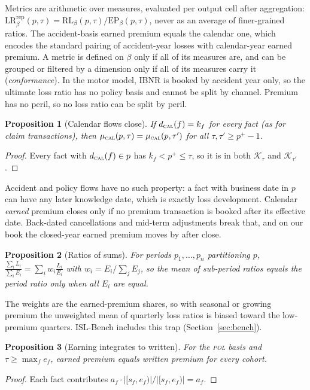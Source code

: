 \documentclass[11pt]{article}
\newtheorem{proposition}{Proposition}
\begin{document}
Metrics are arithmetic over measures, evaluated per output cell after aggregation:
$\mathrm{LR}^{\mathrm{rep}}_\beta(p,\tau) = \mathrm{RL}_\beta(p,\tau) / \mathrm{EP}_\beta(p,\tau)$, never as an
average of finer-grained ratios. The accident-basis earned premium equals the calendar one, which encodes the
standard pairing of accident-year losses with calendar-year earned premium. A metric is defined on $\beta$ only
if all of its measures are, and can be grouped or filtered by a dimension only if all of its measures carry it
(\emph{conformance}). In the motor model, IBNR is booked by accident year only, so the ultimate loss ratio has
no policy basis and cannot be split by channel. Premium has no peril, so no loss ratio can be split by peril.

\begin{proposition}[Calendar flows close]
If $d_{\textsc{cal}}(f) = k_f$ for every fact (as for claim transactions), then
$\mu_{\textsc{cal}}(p,\tau) = \mu_{\textsc{cal}}(p,\tau')$ for all $\tau, \tau' \ge p^+ - 1$.
\end{proposition}
\begin{proof}
Every fact with $d_{\textsc{cal}}(f) \in p$ has $k_f < p^+ \le \tau$, so it is in both $\mathcal{K}_\tau$ and
$\mathcal{K}_{\tau'}$.
\end{proof}
Accident and policy flows have no such property: a fact with business date in $p$ can have any later knowledge
date, which is exactly loss development. Calendar \emph{earned} premium closes only if no premium transaction is
booked after its effective date. Back-dated cancellations and mid-term adjustments break that, and on our book
the closed-year earned premium moves by \EarnedDriftPct{} after close.

\begin{proposition}[Ratios of sums]
For periods $p_1,\dots,p_n$ partitioning $p$, $\frac{\sum_i L_i}{\sum_i E_i} = \sum_i w_i \frac{L_i}{E_i}$ with
$w_i = E_i / \sum_j E_j$, so the mean of sub-period ratios equals the period ratio only when all $E_i$ are equal.
\end{proposition}
The weights are the earned-premium shares, so with seasonal or growing premium the unweighted mean of quarterly
loss ratios is biased toward the low-premium quarters. ISL-Bench includes this trap (Section~\ref{sec:bench}).

\begin{proposition}[Earning integrates to written]
For the \textsc{pol} basis and $\tau \ge \max_f e_f$, earned premium equals written premium for every cohort.
\end{proposition}
\begin{proof}
Each fact contributes $a_f \cdot |[s_f,e_f)| / |[s_f,e_f)| = a_f$.
\end{proof}
\end{document}
